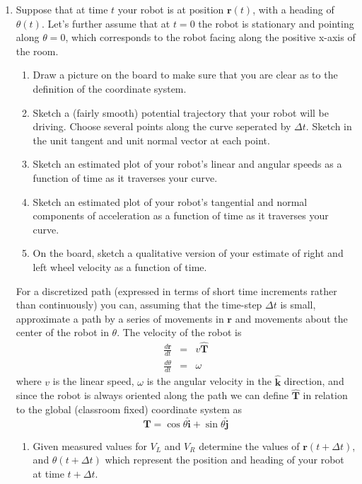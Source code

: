 \documentclass{tufte-handout}
\begin{document}
\begin{enumerate}[resume=exercises, label=\textbf{Exercise} (\arabic*)]
\item Suppose that at time $t$ your robot is at position ${\mathbf r}(t)$, with a heading of $\theta(t)$.  Let's further assume that at $t=0$ the robot is stationary and pointing along $\theta = 0$, which corresponds to the robot facing along the positive x-axis of the room.

\begin{enumerate}
\item Draw a picture on the board to make sure that you are clear as to the definition of the coordinate system.

\item Sketch a (fairly smooth) potential trajectory that your robot will be driving. Choose several points along the curve seperated by $\Delta t$. Sketch in the unit tangent and unit normal vector at each point. 

\item Sketch an estimated plot of your robot's linear and angular speeds as a function of time as it traverses your curve.

\item Sketch an estimated plot of your robot's tangential and normal components of acceleration as a function of time as it traverses your curve.

\item On the board, sketch a qualitative version of your estimate of right and left wheel velocity as a function of time.

\end{enumerate}
 
 For a discretized path (expressed in terms of short time increments rather than continuously) you can, assuming that the time-step $\Delta t$ is small, approximate a path by a series of movements in ${\mathbf r}$ and movements about the center of the robot in $\theta$. The velocity of the robot is
\begin{eqnarray*}
\frac{d {\mathbf r}}{dt} &=& v \hat{\mathbf T} \\
\frac{d \theta}{dt} &=& \omega
\end{eqnarray*}
where $v$ is the linear speed, $\omega$ is the angular velocity in the $\hat{\mathbf k}$ direction, and since the robot is always oriented along the path we can define $\hat{\mathbf T}$ in relation to the global (classroom fixed) coordinate system as
\[\hat{\mathbf T} = \cos \theta \hat{\mathbf{i}} + \sin \theta \hat{\mathbf{j}} \]

\begin{enumerate}[resume]
\item Given measured values for $V_L$ and $V_R$ determine the values of ${\mathbf r}(t+\Delta t)$, and $\theta(t+\Delta t)$ which represent the position and heading of your robot at time $t+\Delta t$.
\end{enumerate}


\end{enumerate}
\end{document}
